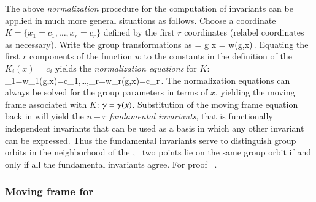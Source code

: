 The above \emph{normalization} procedure for the computation of
invariants can be applied in much more general situations as follows.
Choose a coordinate {\csection} $K=\{x_1=c_1,\ldots,x_r=c_r\}$ defined by the first $r$
coordinates (relabel coordinates as necessary).
Write the group transformations as
\beq
	= g \cdot x = w(g,x)\,.
	\label{eq:transNorm}
\eeq
Equating the first $r$ components of the function $w$ to the
constants in the definition of the {\csection} $K_i(x)=c_i$
yields the \emph{normalization equations} for $K$:
\beq
	_1=w_1(g,x)=c_1,\ldots,_r=w_r(g,x)=c_r\,.
	\label{eq:normalization}
\eeq
The normalization equations 
can always be solved for the group parameters in terms of
$x$, yielding the moving frame associated with $K$:
$\gamma=\gamma(x)$. Substitution of the moving frame equation back
in  will yield the $n-r$
\emph{fundamental invariants}, that is functionally independent
invariants that can be used as a basis in which any other invariant
can be expressed. Thus the fundamental invariants serve to distinguish
group orbits in the neighborhood of the {\csection}, \ie~two points
lie on the same group orbit if and only if all the
fundamental invariants agree. For proof
\cf~.

\subsubsection{Moving frame for \CLe}
\label{sec:CLeMF}


